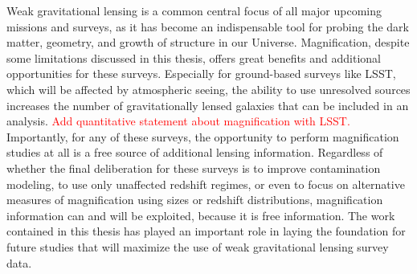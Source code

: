 Weak gravitational lensing is a common central focus of all major upcoming missions and surveys, as it has become an indispensable tool for probing the dark matter, geometry, and growth of structure in our Universe. Magnification, despite some limitations discussed in this thesis, offers great benefits and additional opportunities for these surveys. Especially for ground-based surveys like \ac{LSST}, which will be affected by atmospheric seeing, the ability to use unresolved sources increases the number of gravitationally lensed galaxies that can be included in an analysis. \textcolor{red}{Add quantitative statement about magnification with LSST.} Importantly, for any of these surveys, the opportunity to perform magnification studies at all is a free source of additional lensing information. Regardless of whether the final deliberation for these surveys is to improve contamination modeling, to use only unaffected redshift regimes, or even to focus on alternative measures of magnification using sizes or redshift distributions, magnification information can and will be exploited, because it is free information. The work contained in this thesis has played an important role in laying the foundation for future studies that will maximize the use of weak gravitational lensing survey data.


\endinput
Any text after an \endinput is ignored.
You could put scraps here or things in progress.
